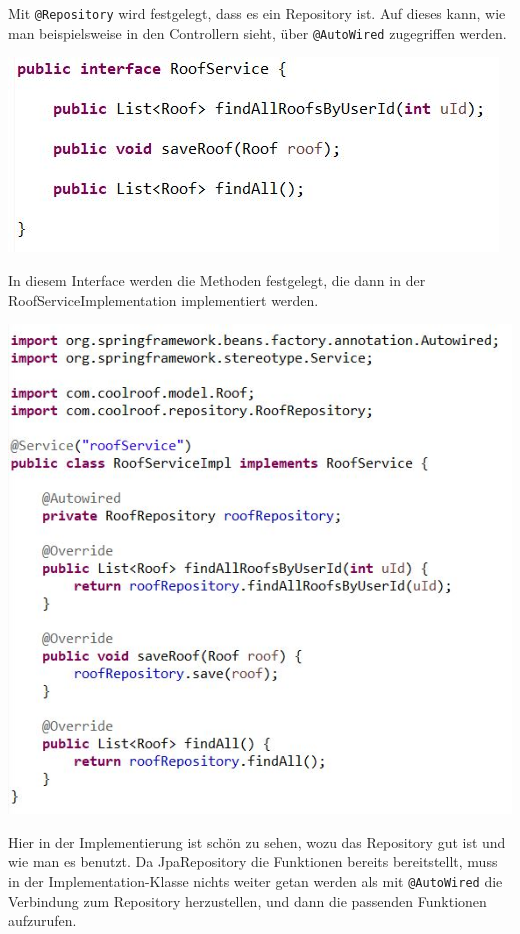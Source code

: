 \documentclass[12pt,a4paper]{article}
\begin{document}
\bigskip
Mit \texttt{@Repository} wird festgelegt, dass es ein Repository ist. Auf dieses kann, wie man beispielsweise in den Controllern sieht, über \texttt{@AutoWired} zugegriffen werden.

\bigskip
\bigskip
\includegraphics[scale=1]{./Graphics/service}

\bigskip
In diesem Interface werden die Methoden festgelegt, die dann in der RoofServiceImplementation implementiert werden.

\bigskip
\bigskip

\includegraphics[scale=1]{./Graphics/service_impl}

\bigskip
Hier in der Implementierung ist schön zu sehen, wozu das Repository gut ist und wie man es benutzt. Da JpaRepository die Funktionen bereits bereitstellt, muss in der Implementation-Klasse nichts weiter getan werden als mit \texttt{@AutoWired} die Verbindung zum Repository herzustellen, und dann die passenden Funktionen aufzurufen. 
\end{document}
